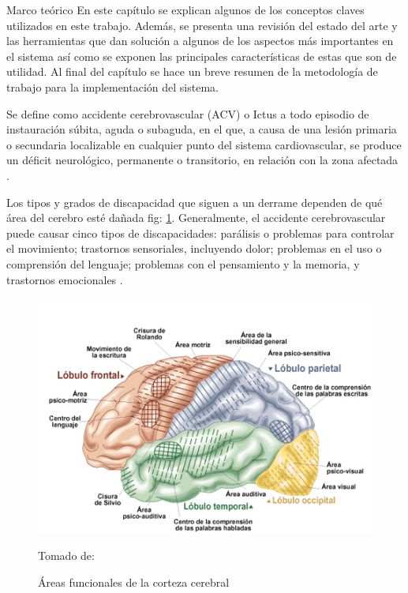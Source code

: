 \begin{thesischapter}{1} {Marco teórico}
    En este capítulo se explican algunos de los conceptos claves utilizados en este trabajo. Además, se presenta una revisión del estado del arte y las herramientas que dan solución a algunos de los aspectos más importantes en el sistema así como se exponen las principales características de estas que son de utilidad. Al final del capítulo se hace un breve resumen de la metodología de trabajo para la implementación del sistema.

    
    \vspace{10pt}
    Se define como accidente cerebrovascular (ACV) o Ictus a todo episodio de instauración súbita, aguda o subaguda, en el que, a causa de una lesión primaria o secundaria localizable en cualquier punto del sistema cardiovascular, se produce un déficit neurológico, permanente o transitorio, en relación con la zona afectada \cite{ictus}.

    \vspace{10pt}
    Los tipos y grados de discapacidad que siguen a un derrame dependen de qué área del cerebro esté dañada fig: \ref{fig: cerebralcortex}. Generalmente, el accidente cerebrovascular puede causar cinco tipos de discapacidades: parálisis o problemas para controlar el movimiento; trastornos sensoriales, incluyendo dolor; problemas en el uso o comprensión del lenguaje; problemas con el pensamiento y la memoria, y trastornos emocionales \cite{post-strok}.

    \begin{figure}[ht]
        \centering
        \includegraphics[scale=0.5]{images/brain.jpg}
        \caption{Áreas funcionales de la corteza cerebral}
        Tomado de: ~\cite{areacereabral}
        \label{fig: cerebralcortex}
    \end{figure}


\end{thesischapter}

